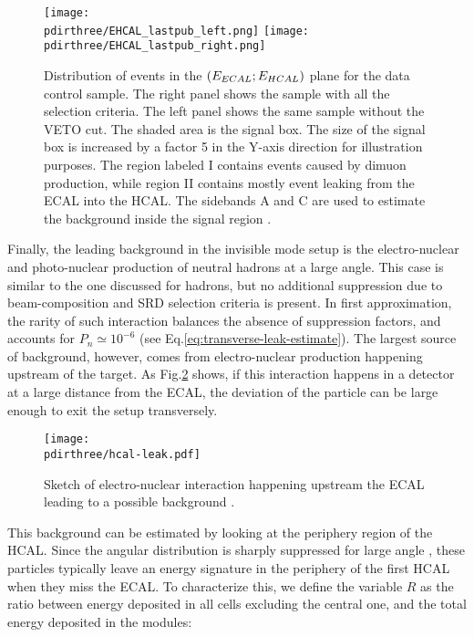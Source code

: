\begin{figure}[bth!]
  \centering
  \texttt{[image: \\pdirthree/EHCAL\_lastpub\_left.png]}
  \texttt{[image: \\pdirthree/EHCAL\_lastpub\_right.png]}
  \caption[ECAL vs HCAL events band]{Distribution of events in the $(E_{ECAL};E_{HCAL})$ plane for the data control sample. The right panel shows the sample with all the selection criteria. The left panel shows the same sample without the VETO cut. The shaded area is the signal box. The size of the signal box is increased by a factor 5 in the Y-axis direction for illustration purposes. The region labeled I contains events caused by dimuon production, while region II contains mostly event leaking from the ECAL into the HCAL. The sidebands A and C are used to estimate the background inside the signal region \cite{NA64:2019imj}.}
  \label{fig:ehcal-bkg-bands}
\end{figure}

Finally, the leading background in the invisible mode setup is the electro-nuclear and photo-nuclear production of neutral hadrons at a large angle. This case is similar to the one discussed for hadrons, but no additional suppression due to beam-composition and SRD selection criteria is present. In first approximation, the rarity of such interaction balances the absence of suppression factors, and accounts for $P_n \simeq 10^{-6}$ (see Eq.\ref{eq:transverse-leak-estimate}).
The largest source of background, however, comes from electro-nuclear production happening upstream of the target. As Fig.\ref{fig:eh-prod-sketch} shows, if this interaction happens in a detector at a large distance from the ECAL, the deviation of the particle can be large enough to exit the setup transversely. 


\begin{figure}[bth!]
  \centering
  \texttt{[image: \\pdirthree/hcal-leak.pdf]}
  \caption[upstream electro-hadron production upstream]{Sketch of electro-nuclear interaction happening upstream the ECAL leading to a possible background \cite{pdegen-thesis}.}
  \label{fig:eh-prod-sketch}
\end{figure}

This background can be estimated by looking at the periphery region of the HCAL. Since the angular distribution is sharply suppressed for large angle \cite{AUTIERO1998285,GNINENKO1998583}, these particles typically leave an energy signature in the periphery of the first HCAL when they miss the ECAL. To characterize this, we define the variable $R$ as the ratio between energy deposited in all cells excluding the central one, and the total energy deposited in the modules:

